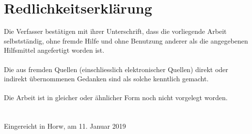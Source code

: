 \documentclass[main.tex]{subfiles}
\begin{document}
\section*{Redlichkeitserklärung}

Die Verfasser bestätigen mit ihrer Unterschrift, dass die vorliegende Arbeit selbstständig, ohne fremde Hilfe und ohne Benutzung anderer als die angegebenen Hilfsmittel angefertigt worden ist.\\
\\
Die aus fremden Quellen (einschliesslich elektronischer Quellen) direkt oder indirekt übernommenen Gedanken sind als solche kenntlich gemacht.\\
\\
Die Arbeit ist in gleicher oder ähnlicher Form noch nicht vorgelegt worden.\\
\\
\\
Eingereicht in Horw, am 11. Januar 2019\\
\\
\end{document}
